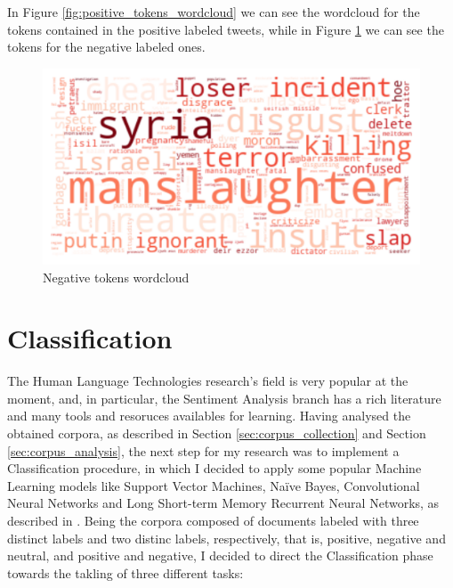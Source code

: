 \documentclass[11pt,twocolumn]{article}
\begin{document}
        \noindent
        In Figure \ref{fig:positive_tokens_wordcloud} we can see the wordcloud for the tokens contained in the
        positive labeled tweets, while in Figure \ref{fig:negative_tokens_wordcloud} we can see the tokens for
        the negative labeled ones.

        \begin{figure}[h]
            \centering
            \includegraphics[width=\linewidth]{negative_tokens_wordcloud.pdf}
            \caption{Negative tokens wordcloud}
            \label{fig:negative_tokens_wordcloud}
        \end{figure}

    \section{Classification} %
    \label{sec:classification}
        The Human Language Technologies research's field is very popular at the moment, and, in particular, the
        Sentiment Analysis branch has a rich literature and many tools and resoruces availables for learning.
        Having analysed the obtained corpora, as described in Section \ref{sec:corpus_collection} and Section
        \ref{sec:corpus_analysis}, the next step for my research was to implement a Classification procedure,
        in which I decided to apply some popular Machine Learning models like Support Vector Machines,
        Naïve Bayes, Convolutional Neural Networks and Long Short-term Memory Recurrent Neural Networks, as
        described in \cite{semeval_2014,state_of_the_art,semeval_2016,esuli,attardi}. Being the corpora composed
        of documents labeled with three distinct labels and two distinc labels, respectively, that is, positive,
        negative and neutral, and positive and negative, I decided to direct the Classification phase towards the
        takling of three different tasks:
\end{document}
